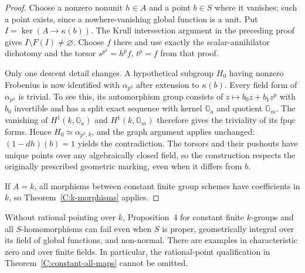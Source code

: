 \begin{proof}
Choose a nonzero nonunit $h\in A$ and a point $b\in S$ where it
vanishes; such a point exists, since a nowhere-vanishing global
function is a unit.  Put $I=\ker(A\to\kappa(b))$.  The Krull
intersection argument in the preceding proof gives
$I\setminus F(I)\ne\varnothing$.  Choose $f$ there and use exactly
the scalar-annihilator dichotomy and the torsor
$s^{p^2}=h^pf$, $t^p=f$ from that proof.

Only one descent detail changes.  A hypothetical subgroup $H_0$
having nonzero Frobenius is now identified with $\alpha_{p^2}$ after
extension to $\kappa(b)$.  Every field form of $\alpha_{p^2}$ is
trivial.  To see this, its automorphism group consists of
$z\mapsto b_0z+b_1z^p$ with $b_0$ invertible and has a split exact
sequence with kernel $\mathbb G_a$ and quotient $\mathbb G_m$.
The vanishing of $H^1(k,\mathbb G_a)$ and $H^1(k,\mathbb G_m)$
therefore gives the triviality of its fpqc forms.  Hence
$H_0\simeq\alpha_{p^2,k}$, and the graph argument applies unchanged:
$(1-dh)(b)=1$ yields the contradiction.  The torsors and their
pushouts have unique points over any algebraically closed field, so
the construction respects the originally prescribed geometric
marking, even when it differs from $b$.

If $A=k$, all morphisms between constant finite group schemes have
coefficients in $k$, so Theorem~\ref{C:k-morphisms} applies.
\end{proof}

\begin{proposition}
\label{C:field-descent}
Without rational pointing over $k$, Proposition~4 for constant finite
$k$-groups and all $S$-homomorphisms can fail even when $S$ is proper,
geometrically integral over its field of global functions, and
non-normal.  There are examples in characteristic zero and over
finite fields.  In particular, the rational-point qualification in
Theorem~\ref{C:constant-all-maps} cannot be omitted.
\end{proposition}

